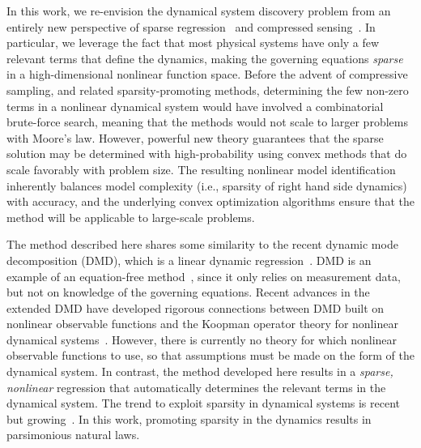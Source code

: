 \documentclass[onecolumn,11pt]{article}
\begin{document}
In this work, we re-envision the dynamical system discovery problem from an entirely new perspective of sparse regression~\cite{Tibshirani1996lasso,Hastie2009book,James2013book} and compressed sensing~\cite{Donoho2006ieeetit,Candes2006bieeetit,Candes2006cpam,Candes2006picm,Baraniuk2007ieeespm,Tropp:2007}.
In particular, we leverage the fact that most physical systems have only a few relevant terms that define the dynamics, making the governing equations \emph{sparse} in a high-dimensional nonlinear function space.  
Before the advent of compressive sampling, and related sparsity-promoting methods, determining the few non-zero terms in a nonlinear dynamical system would have involved a combinatorial brute-force search, meaning that the methods would not scale to larger problems with Moore's law.  
However, powerful new theory guarantees that the sparse solution may be determined with high-probability using convex methods that do scale favorably with problem size.  
The resulting nonlinear model identification inherently balances model complexity (i.e., sparsity of right hand side dynamics) with accuracy, and the underlying convex optimization algorithms ensure that the method will be applicable to large-scale problems.

The method described here shares some similarity to the recent dynamic mode decomposition (DMD), which is a linear dynamic regression~\cite{Rowley2009jfm,schmid:2010}.  
DMD is an example of an equation-free method~\cite{Kevrekidis2003cms}, since it only relies on measurement data, but not on knowledge of the governing equations.  
Recent advances in the extended DMD have developed rigorous connections between DMD built on nonlinear observable functions and the Koopman operator theory for nonlinear dynamical systems~\cite{Rowley2009jfm,Mezic2013arfm}.  
However, there is currently no theory for which nonlinear observable functions to use, so that assumptions must be made on the form of the dynamical system.  
In contrast, the method developed here results in a \emph{sparse, nonlinear} regression that automatically determines the relevant terms in the dynamical system.  
The trend to exploit sparsity in dynamical systems is recent but growing~\cite{Schaeffer2013pnas,Ozolicnvs2013pnas,mackey2014compressive,Brunton2014siads,Proctor2014epj,Bai2014aiaa}.  
In this work, promoting sparsity in the dynamics results in parsimonious natural laws.\\
\end{document}
